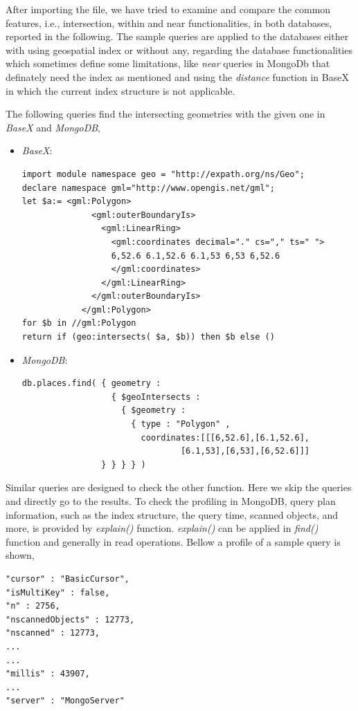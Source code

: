 \documentclass[a4paper,12pt]{article}
\begin{document}
After importing the file, we have tried to examine and compare the common features, i.e., intersection, within and near functionalities, in both databases, reported in the following.
The sample queries are applied to the databases either with using geospatial index or without any, regarding the database functionalities which sometimes define some limitations, like \textit{near} queries in MongoDb that definately need the index as mentioned and using the \textit{distance} function in BaseX in which the current index structure is not applicable.
 
The following queries find the intersecting geometries with the given one in \textit{BaseX} and \textit{MongoDB},
\begin{itemize}
\item \textit{BaseX}:
\begin{verbatim}
import module namespace geo = "http://expath.org/ns/Geo";
declare namespace gml="http://www.opengis.net/gml";
let $a:= <gml:Polygon>
              <gml:outerBoundaryIs>
                <gml:LinearRing>
                  <gml:coordinates decimal="." cs="," ts=" ">
                  6,52.6 6.1,52.6 6.1,53 6,53 6,52.6
                  </gml:coordinates>
                </gml:LinearRing>
              </gml:outerBoundaryIs>
            </gml:Polygon>
for $b in //gml:Polygon 
return if (geo:intersects( $a, $b)) then $b else ()
\end{verbatim}
\item \textit{MongoDB}: 
\begin{verbatim}
db.places.find( { geometry :
                  { $geoIntersects :
                    { $geometry :
                      { type : "Polygon" ,
                        coordinates:[[[6,52.6],[6.1,52.6],
                        	    [6.1,53],[6,53],[6,52.6]]]
                } } } } )
\end{verbatim}
\end{itemize}
Similar queries are designed to check the other function. Here we skip the queries and directly go to the results. To check the profiling in MongoDB, query plan information, such as the index structure, the query time, scanned objects, and more, is provided by \textit{explain()} function. \textit{explain()} can be applied in \textit{find()} function and generally in read operations. Bellow a profile of a sample query is shown,

\begin{verbatim}
"cursor" : "BasicCursor",
"isMultiKey" : false,
"n" : 2756,
"nscannedObjects" : 12773,
"nscanned" : 12773,
...
...
"millis" : 43907,
...
"server" : "MongoServer"
\end{verbatim}
\end{document}
